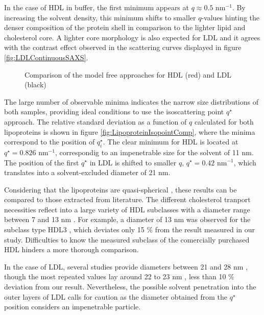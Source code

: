 In the case of HDL in buffer, the first minimum appears at $q\approx0.5$ nm$^{-1}$. By increasing the solvent density, this minimum shifts to smaller $q$-values hinting the denser composition of the protein shell in comparison to the lighter lipid and cholesterol core. A lighter core morphology is also expected for LDL \citep{luzzati_structure_1979} and it agrees with the contrast effect observed in the scattering curves displayed in figure \ref{fig:LDLContinuousSAXS}.

\begin{figure}
	\centering
		\caption[Model free-approaches to the experimental data of HDL and LDL.]{Comparison of the model free approaches for HDL (red) and LDL (black)}
\end{figure}

The large number of observable minima indicates the narrow size distributions of both samples, providing ideal conditions to use the isoscattering point $q^{\star}$ approach. The relative standard deviation as a function of $q$ calculated for both lipoproteins is shown in figure \ref{fig:LipoproteinIsopointComp}, where the minima correspond to the position of $q^{\star}_i$. The clear minimum for HDL is located at $q^{\star}=0.826$ nm$^{-1}$, correspondig to an impenetrable size for the solvent of 11 nm. The position of the first $q^{\star}$ in LDL is shifted to smaller $q$, $q^{\star}=0.42$ nm$^{-1}$, which translates into a solvent-excluded diameter of 21 nm.

Considering that the lipoproteins are quasi-spherical \citep{stuhrmann_neutron_1975}, these results can be compared to those extracted from literature. The different cholesterol tranport necessities reflect into a large variety of HDL subclasses with a diameter range between 7 and 13 nm \citep{german_lipoproteins:_2006}. For example, a diameter of 13 nm was observed for the subclass type HDL3 \citep{tardieu_structure_1976}, which deviates only 15 $\%$ from the result measured in our study. Difficulties to know the measured subclass of the comercially purchased HDL hinders a more thorough comparison.

In the case of LDL, several studies provide diameters between 21 and 28 nm \citep{tardieu_structure_1976,colhoun_lipoprotein_2002,german_lipoproteins:_2006}, though the most repeated values lay around 22 to 23 nm \citep{muller_structure_1978,luzzati_structure_1979}, less than 10 $\%$ deviation from our result. Nevertheless, the possible solvent penetration into the outer layers of LDL \citep{stuhrmann_neutron_1975,tardieu_structure_1976} calls for caution as the diameter obtained from the $q^{\star}$ position considers an impenetrable particle.

